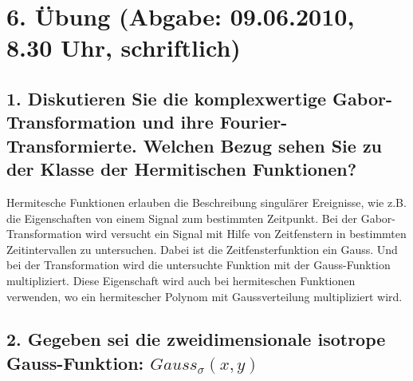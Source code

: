 \section*{6. \"Ubung (Abgabe: 09.06.2010, 8.30 Uhr, schriftlich)}

\subsection*{1. Diskutieren Sie die komplexwertige Gabor-Transformation und ihre Fourier-Transformierte. Welchen Bezug sehen Sie zu der Klasse der Hermitischen Funktionen?}
Hermitesche Funktionen erlauben die Beschreibung singulärer Ereignisse, wie z.B. die Eigenschaften von einem Signal zum bestimmten Zeitpunkt. Bei der Gabor-Transformation wird versucht ein Signal mit Hilfe von Zeitfenstern in bestimmten Zeitintervallen zu untersuchen. Dabei ist die Zeitfensterfunktion ein Gauss. Und bei der Transformation wird die untersuchte Funktion mit der Gauss-Funktion multipliziert. Diese Eigenschaft wird auch bei hermiteschen Funktionen verwenden, wo ein hermitescher Polynom mit Gaussverteilung multipliziert wird.

\subsection*{2. Gegeben sei die zweidimensionale isotrope Gauss-Funktion: $Gauss_{\sigma}(x,y)$}
